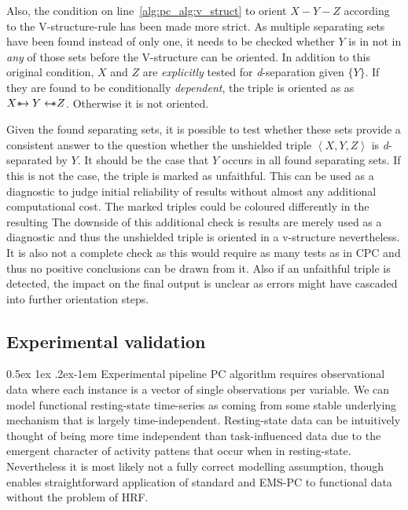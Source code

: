 \documentclass[a4paper, 10pt, english, onecolumn]{article}
\makeatletter
\def \srightarrow {\text{\textasteriskcentered}\hspace{-0.62em}\rightarrow}
\def \sleftarrow {\leftarrow\hspace{-0.62em}\text{\textasteriskcentered}}
\renewcommand{\paragraph}{%
  \@startsection{paragraph}{4}%
  {\z@}{0.5ex \@plus 1ex \@minus .2ex}{-1em}%
  {\normalfont\normalsize\bfseries}%
}
\makeatother
\begin{document}
Also, the condition on line~\ref{alg:pc_alg:v_struct} to orient $X - Y - Z$ according to the V-structure-rule has been made more strict.
As multiple separating sets have been found instead of only one, it needs to be checked whether $Y$ is in not in \emph{any} of those sets before the V-structure can be oriented.
In addition to this original condition, $X$ and $Z$ are \textit{explicitly} tested for \textit{d}-separation given $\{Y\}$.
If they are found to be conditionally \textit{dependent}, the triple is oriented as as $X \srightarrow Y \sleftarrow Z$.
Otherwise it is not oriented.

Given the found separating sets, it is possible to test whether these sets provide a consistent answer to the question whether the unshielded triple $\left<X,Y,Z\right>$ is \textit{d}-separated by $Y$.
It should be the case that $Y$ occurs in all found separating sets.
If this is not the case, the triple is marked as unfaithful.
This can be used as a diagnostic to judge initial reliability of results without almost any additional computational cost.
The marked triples could be coloured differently in the resulting 
The downside of this additional check is results are merely used as a diagnostic and thus the unshielded triple is oriented in a v-structure nevertheless.
It is also not a complete check as this would require as many tests as in CPC and thus no positive conclusions can be drawn from it.
Also if an unfaithful triple is detected, the impact on the final output is unclear as errors might have cascaded into further orientation steps.

\subsection{Experimental validation}
\paragraph{Experimental pipeline}\label{sec:pipeline}
PC algorithm requires observational data where each instance is a vector of single observations per variable.
We can model functional resting-state time-series as coming from some stable underlying mechanism that is largely time-independent.
Resting-state data can be intuitively thought of being more time independent than task-influenced data due to the emergent character of activity pattens that occur when in resting-state.
Nevertheless it is most likely not a fully correct modelling assumption, though enables straightforward application of standard and EMS-PC to functional data without the problem of HRF.
\end{document}
